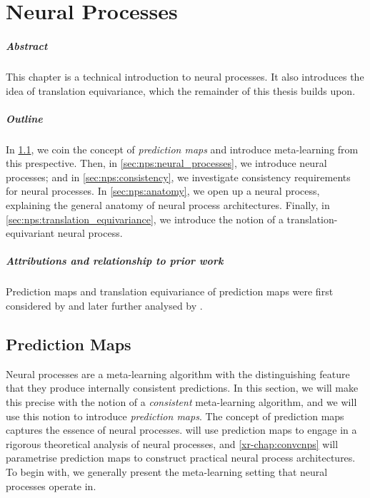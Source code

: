 \documentclass[12pt, twoside]{report}
\newcommand{\xrprefix}[1]{xr-#1}
\begin{document}
\chapter{Neural Processes}
\label{chap:nps}

\paragraph{Abstract}
This chapter is a technical introduction to neural processes.
It also introduces the idea of translation equivariance, which the remainder of this thesis builds upon.

\paragraph{Outline}
In \cref{sec:nps:introduction}, we coin the concept of \emph{prediction maps}
and introduce meta-learning from this prespective.
Then, in \cref{sec:nps:neural_processes}, we introduce neural processes;
and in \cref{sec:nps:consistency}, we investigate consistency requirements for neural processes.
In \cref{sec:nps:anatomy}, we open up a neural process, explaining the general anatomy of neural process architectures.
Finally, in \cref{sec:nps:translation_equivariance}, we introduce the notion of a translation-equivariant neural process.

\paragraph{Attributions and relationship to prior work}
Prediction maps and translation equivariance of prediction maps were first considered by  and later further analysed by .

\section{Prediction Maps}
\label{sec:nps:introduction}

Neural processes are a meta-learning algorithm with the distinguishing feature that they produce internally consistent predictions.
In this section, we will make this precise with the notion of a \emph{consistent} meta-learning algorithm,
and we will use this notion to introduce \emph{prediction maps}.
The concept of prediction maps captures the essence of neural processes.
\Cref{\xrprefix{chap:predmap}} will use prediction maps to engage in a rigorous theoretical analysis of neural processes,
and \cref{\xrprefix{chap:convcnps}} will parametrise prediction maps to construct practical neural process architectures.
To begin with, we generally present the meta-learning setting that neural processes operate in.
\end{document}
